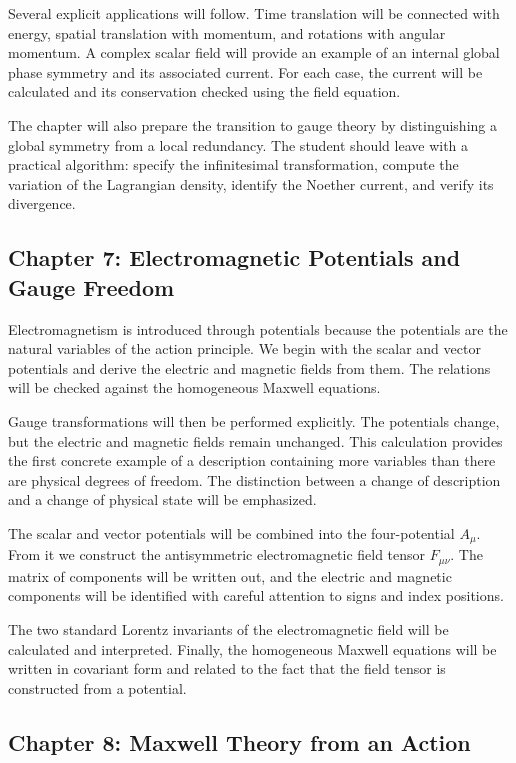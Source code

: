 Several explicit applications will follow. Time translation will be connected with energy, spatial translation with momentum, and rotations with angular momentum. A complex scalar field will provide an example of an internal global phase symmetry and its associated current. For each case, the current will be calculated and its conservation checked using the field equation.

The chapter will also prepare the transition to gauge theory by distinguishing a global symmetry from a local redundancy. The student should leave with a practical algorithm: specify the infinitesimal transformation, compute the variation of the Lagrangian density, identify the Noether current, and verify its divergence.

\subsection*{Chapter 7: Electromagnetic Potentials and Gauge Freedom}

Electromagnetism is introduced through potentials because the potentials are the natural variables of the action principle. We begin with the scalar and vector potentials and derive the electric and magnetic fields from them. The relations will be checked against the homogeneous Maxwell equations.

Gauge transformations will then be performed explicitly. The potentials change, but the electric and magnetic fields remain unchanged. This calculation provides the first concrete example of a description containing more variables than there are physical degrees of freedom. The distinction between a change of description and a change of physical state will be emphasized.

The scalar and vector potentials will be combined into the four-potential \(A_{\mu}\). From it we construct the antisymmetric electromagnetic field tensor \(F_{\mu\nu}\). The matrix of components will be written out, and the electric and magnetic components will be identified with careful attention to signs and index positions.

The two standard Lorentz invariants of the electromagnetic field will be calculated and interpreted. Finally, the homogeneous Maxwell equations will be written in covariant form and related to the fact that the field tensor is constructed from a potential.

\subsection*{Chapter 8: Maxwell Theory from an Action}

